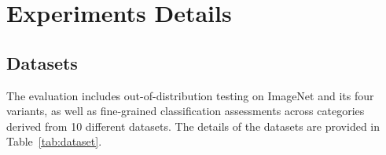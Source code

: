 \begin{comment}
Our method has several limitations that should be addressed in future work.
\newline

\noindent\textbf{Architecture.}\hspace{5mm}
LoRA is primarily used for transformer-based architectures.
Similarly, the reconstruction approach based on MAE is also limited to transformer-based architectures, restricting its generalizability to other model types.
\newline

\noindent\textbf{Downstream task.}\hspace{5mm}
The MEM loss is primarily designed for image classification tasks, and its adaptation to other downstream tasks, such as object detection or segmentation, is not straightforward.
In contrast, the MAE loss is not specifically designed for any particular downstream task.
Thus, extending MAE loss to these tasks remains a promising direction for future work.
\newline

\noindent\textbf{Hyperparameter tuning.}\hspace{5mm}
Tuning LoRA hyperparameters (e.g., $r$ and $\gamma$) is crucial, as their optimal values vary depending on the target domain, as shown in \cref{fig:lora} of the main paper.
Developing a mechanism to dynamically adjust these hyperparameters based on domain characteristics could significantly enhance the method's adaptability and performance.
\end{comment}

\section{Experiments Details}

\subsection{Datasets}
The evaluation includes out-of-distribution testing on ImageNet and its four variants, as well as fine-grained classification assessments across categories derived from 10 different datasets.
The details of the datasets are provided in Table~\ref{tab:dataset}.

